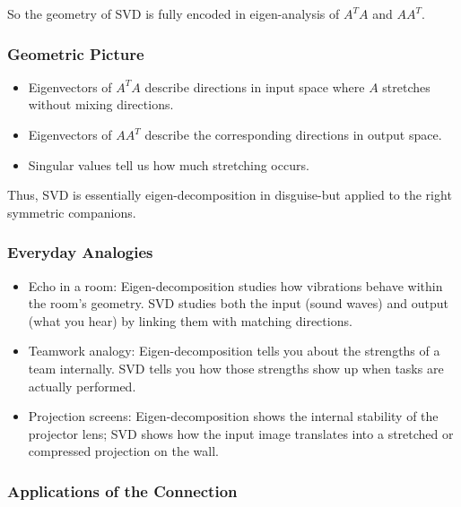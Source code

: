 \documentclass[
  letterpaper,
  DIV=11,
  numbers=noendperiod]{scrreprt}
\providecommand{\tightlist}{%
  \setlength{\itemsep}{0pt}\setlength{\parskip}{0pt}}
\begin{document}
So the geometry of SVD is fully encoded in eigen-analysis of \(A^T A\)
and \(AA^T\).

\subsubsection{Geometric Picture}\label{geometric-picture-1}

\begin{itemize}
\tightlist
\item
  Eigenvectors of \(A^T A\) describe directions in input space where
  \(A\) stretches without mixing directions.
\item
  Eigenvectors of \(AA^T\) describe the corresponding directions in
  output space.
\item
  Singular values tell us how much stretching occurs.
\end{itemize}

Thus, SVD is essentially eigen-decomposition in disguise-but applied to
the right symmetric companions.

\subsubsection{Everyday Analogies}\label{everyday-analogies-79}

\begin{itemize}
\tightlist
\item
  Echo in a room: Eigen-decomposition studies how vibrations behave
  within the room's geometry. SVD studies both the input (sound waves)
  and output (what you hear) by linking them with matching directions.
\item
  Teamwork analogy: Eigen-decomposition tells you about the strengths of
  a team internally. SVD tells you how those strengths show up when
  tasks are actually performed.
\item
  Projection screens: Eigen-decomposition shows the internal stability
  of the projector lens; SVD shows how the input image translates into a
  stretched or compressed projection on the wall.
\end{itemize}

\subsubsection{Applications of the
Connection}\label{applications-of-the-connection}
\end{document}
